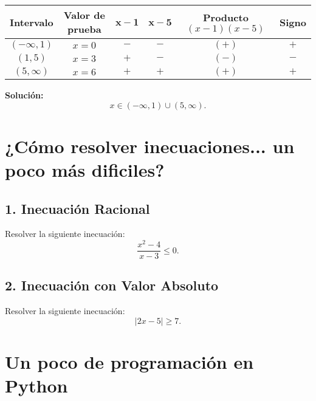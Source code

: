 \documentclass[a4,11pt]{aleph-notas}
\begin{document}
\begin{center}
\begin{tabular}{|c|c|c|c|c|c|}
\hline
\textbf{Intervalo}       & \textbf{Valor de prueba} & \(\mathbf{x - 1}\) & \(\mathbf{x - 5}\) & \textbf{Producto \((x - 1)(x - 5)\)} & \textbf{Signo} \\
\hline
\( (-\infty, 1) \)       & \( x = 0 \)              & \(-\)              & \(-\)              & \( (+) \)                             & \(+\)          \\
\hline
\( (1, 5) \)             & \( x = 3 \)              & \(+\)              & \(-\)              & \( (-) \)                             & \(-\)          \\
\hline
\( (5, \infty) \)        & \( x = 6 \)              & \(+\)              & \(+\)              & \( (+) \)                             & \(+\)          \\
\hline
\end{tabular}
\end{center}

\textbf{Solución:}
$$
x \in (-\infty, 1) \cup (5, \infty).
$$

\section{¿Cómo resolver inecuaciones... un poco más dificiles?}

\subsection*{1. Inecuación Racional}

Resolver la siguiente inecuación:
$$
\frac{x^2 - 4}{x - 3} \leq 0.
$$

\subsection*{2. Inecuación con Valor Absoluto}

Resolver la siguiente inecuación:
$$
|2x - 5| \geq 7.
$$



\section{Un poco de programación en Python}

\end{document}
